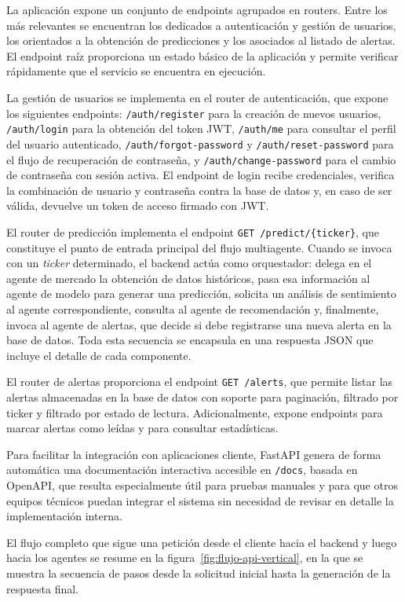 La aplicación expone un conjunto de endpoints agrupados en routers. Entre los más relevantes se encuentran los dedicados a autenticación y gestión de usuarios, los orientados a la obtención de predicciones y los asociados al listado de alertas. El endpoint raíz proporciona un estado básico de la aplicación y permite verificar rápidamente que el servicio se encuentra en ejecución.

La gestión de usuarios se implementa en el router de autenticación, que expone
los siguientes endpoints: \texttt{/auth/register} para la creación de nuevos
usuarios, \texttt{/auth/login} para la obtención del token JWT,
\texttt{/auth/me} para consultar el perfil del usuario autenticado,
\texttt{/auth/forgot-password} y \texttt{/auth/reset-password} para el flujo
de recuperación de contraseña, y \texttt{/auth/change-password} para el cambio
de contraseña con sesión activa. El endpoint de login recibe credenciales,
verifica la combinación de usuario y contraseña contra la base de datos y, en
caso de ser válida, devuelve un token de acceso firmado con JWT.

El router de predicción implementa el endpoint
\texttt{GET /predict/\{ticker\}}, que constituye el punto de entrada principal
del flujo multiagente. Cuando se invoca con un \textit{ticker} determinado, el
backend actúa como orquestador: delega en el agente de mercado la obtención de
datos históricos, pasa esa información al agente de modelo para generar una
predicción, solicita un análisis de sentimiento al agente correspondiente,
consulta al agente de recomendación y, finalmente, invoca al agente de alertas,
que decide si debe registrarse una nueva alerta en la base de datos. Toda esta
secuencia se encapsula en una respuesta JSON que incluye el detalle de cada
componente.

El router de alertas proporciona el endpoint \texttt{GET /alerts}, que permite
listar las alertas almacenadas en la base de datos con soporte para paginación,
filtrado por ticker y filtrado por estado de lectura. Adicionalmente,
expone endpoints para marcar alertas como leídas y para consultar estadísticas.

Para facilitar la integración con aplicaciones cliente, FastAPI genera de forma
automática una documentación interactiva accesible en \texttt{/docs}, basada en
OpenAPI, que resulta especialmente útil para pruebas manuales y para que otros
equipos técnicos puedan integrar el sistema sin necesidad de revisar en detalle
la implementación interna.


El flujo completo que sigue una petición desde el cliente hacia el backend y luego hacia los agentes se resume en la figura~\ref{fig:flujo-api-vertical}, en la que se muestra la secuencia de pasos desde la solicitud inicial hasta la generación de la respuesta final.

